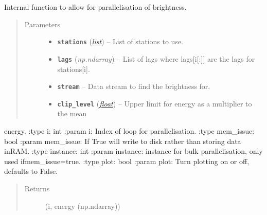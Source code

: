\documentclass[a4paper,10pt,english]{sphinxmanual}
\begin{document}
\begin{fulllineitems}
\label{submodules/core.bright_lights:bright_lights._node_loop}
Internal function to allow for parallelisation of brightness.
\begin{quote}\begin{description}
\item[{Parameters}] \leavevmode\begin{itemize}
\item {} 
\textbf{\texttt{stations}} (\href{https://docs.python.org/library/functions.html\#list}{\emph{list}}) -- List of stations to use.

\item {} 
\textbf{\texttt{lags}} (\emph{np.ndarray}) -- List of lags where lags{[}i{[}:{]}{]} are the lags for stations{[}i{]}.

\item {} 
\textbf{\texttt{stream}} -- Data stream to find the brightness for.

\item {} 
\textbf{\texttt{clip\_level}} (\href{https://docs.python.org/library/functions.html\#float}{\emph{float}}) -- Upper limit for energy as a multiplier to the mean

\end{itemize}

\end{description}\end{quote}

energy.
:type i: int
:param i: Index of loop for parallelisation.
:type mem\_issue: bool
:param mem\_issue: If True will write to disk rather than storing data inRAM.
:type instance: int
:param instance: instance for bulk parallelisation, only used ifmem\_issue=true.
:type plot: bool
:param plot: Turn plotting on or off, defaults to False.
\begin{quote}\begin{description}
\item[{Returns}] \leavevmode
(i, energy (np.ndarray))

\end{description}\end{quote}

\end{fulllineitems}

\end{document}
